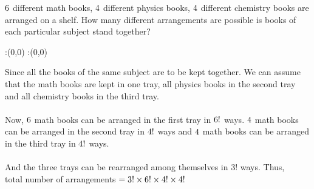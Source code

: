 



\question[4] $6$ different math books, $4$ different physics books, $4$ different chemistry books are arranged on a shelf. How many different arrangements are possible is books of each particular subject stand together?   


\watchout

\ifprintanswers
  \begin{marginfigure}
      :(0,0)
      :(0,0)
    \figdrawbegin{}
      \figdrawline [100,101]
    \figdrawend
    \figvisu{\figBoxA}{}{%
    }
    \centerline{\box\figBoxA}
  \end{marginfigure}
\fi 

\begin{solution}[\halfpage]
Since all the books of the same  subject are to be kept together. We can assume that the math books are kept in one tray, all physics books in the second tray and all chemistry books in the third tray.\\
\\ 
Now, $6$ math books can be arranged in the first tray in $6!$ ways. $4$ math books can be arranged in the second tray in $4!$ ways and $4$ math books can be arranged in the third tray in $4!$ ways.\\
\\
And the three trays can be rearranged among themselves in $3!$ ways. Thus,\\
total number of arrangements $= 3! \times 6! \times 4! \times 4! $
\end{solution}


\ifprintanswers\begin{codex}\end{codex}\fi
